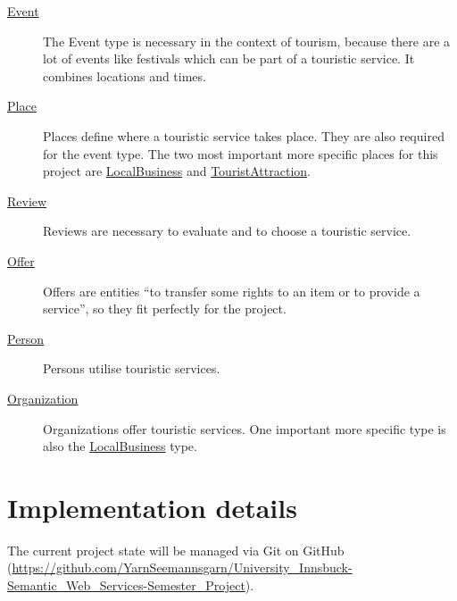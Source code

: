\documentclass[paper=a4, fontsize=12pt]{scrartcl} %
\numberwithin{equation}{section} %
\numberwithin{figure}{section} %
\numberwithin{table}{section} %
\begin{document}
\begin{description}
\item[\href{https://schema.org/Event}{Event}] The Event type is necessary in the context of tourism, because there are a lot of events like festivals which can be part of a touristic service. It combines locations and times.
\item[\href{https://schema.org/Place}{Place}] Places define where a touristic service takes place. They are also required for the event type. The two most important more specific places for this project are \href{https://schema.org/LocalBusiness}{LocalBusiness} and \href{https://schema.org/TouristAttraction}{TouristAttraction}.
\item[\href{https://schema.org/Review}{Review}] Reviews are necessary to evaluate and to choose a touristic service.
\item[\href{https://schema.org/Offer}{Offer}] Offers are entities ``to transfer some rights to an item or to provide a service'', so they fit perfectly for the project.
\item[\href{https://schema.org/Person}{Person}] Persons utilise touristic services.
\item[\href{https://schema.org/Organization}{Organization}] Organizations offer touristic services. One important more specific type is also the \href{https://schema.org/LocalBusiness}{LocalBusiness} type.
\end{description}


\section{Implementation details}
\label{sec:implementation_details}

The current project state will be managed via Git on GitHub (\href{https://github.com/YarnSeemannsgarn/University_Innsbuck-Semantic_Web_Services-Semester_Project}{https://\allowbreak{}github.\allowbreak{}com/\allowbreak{}YarnSeemannsgarn/\allowbreak{}University\_Innsbuck-\allowbreak{}Semantic\_Web\_Services-\allowbreak{}Semester\_Project}).


\end{document}
